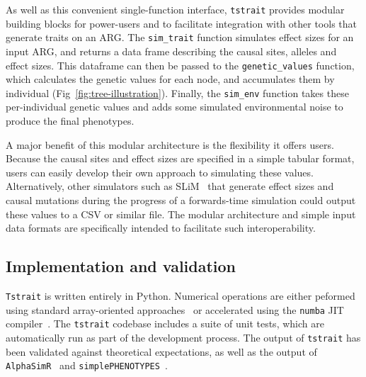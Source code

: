 \documentclass[unnumsec,webpdf,modern,large,namedate]{oup-authoring-template}%
\begin{document}
As well as this convenient single-function interface,
\texttt{tstrait} provides modular building blocks for power-users
and to facilitate integration with other tools that generate
traits on an ARG. The \texttt{sim\_trait} function
simulates effect sizes for an input ARG, and returns a data frame
describing the causal sites, alleles and effect sizes.
This dataframe can then be passed to the \texttt{genetic\_values}
function, which calculates the genetic values for each
node, and accumulates them by individual
(Fig~\ref{fig:tree-illustration}). Finally, the \texttt{sim\_env}
function takes these per-individual genetic values
and adds some simulated environmental noise to produce the final
phenotypes.

A major benefit of this modular architecture is the flexibility it offers
users. Because the causal sites and effect sizes are specified in a
simple tabular format, users can easily develop their own approach
to simulating these values. Alternatively, other simulators
such as SLiM~\citep{haller2023} that generate effect sizes and
causal mutations during the progress of a forwards-time simulation
could output these
values to a CSV or similar file. The modular architecture  and simple
input data formats are specifically intended to facilitate such
interoperability.

\subsection{Implementation and validation}
\texttt{Tstrait} is written entirely in Python. Numerical operations
are either peformed using standard array-oriented
approaches~\citep{numpy} or accelerated
using the \texttt{numba} JIT compiler~\citep{numba}.
The \texttt{tstrait} codebase includes a suite of unit tests,
which are automatically run as part of the development process. The
output of \texttt{tstrait} has been validated against
theoretical expectations, as well as the output
of \texttt{AlphaSimR}~\citep{gaynor2021} and
\texttt{simplePHENOTYPES}~\citep{fernandes2020}.
\end{document}
